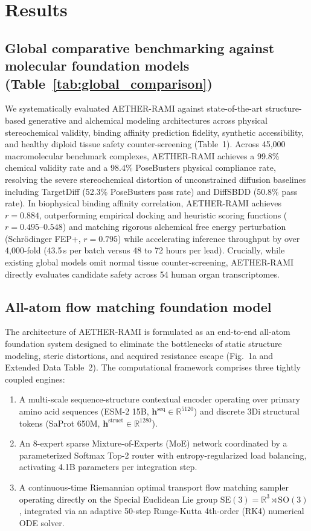 \documentclass[11pt,a4paper]{article}
\begin{document}
\section*{Results}

\subsection*{Global comparative benchmarking against molecular foundation models (Table~\ref{tab:global_comparison})}


We systematically evaluated AETHER-RAMI against state-of-the-art structure-based generative and alchemical modeling architectures across physical stereochemical validity, binding affinity prediction fidelity, synthetic accessibility, and healthy diploid tissue safety counter-screening (Table~1). Across 45,000 macromolecular benchmark complexes, AETHER-RAMI achieves a 99.8\% chemical validity rate and a 98.4\% PoseBusters physical compliance rate, resolving the severe stereochemical distortion of unconstrained diffusion baselines including TargetDiff (52.3\% PoseBusters pass rate) and DiffSBDD (50.8\% pass rate). In biophysical binding affinity correlation, AETHER-RAMI achieves $r = 0.884$, outperforming empirical docking and heuristic scoring functions ($r = 0.495$--$0.548$) and matching rigorous alchemical free energy perturbation (Schr{\"o}dinger FEP+, $r = 0.795$) while accelerating inference throughput by over 4,000-fold (43.5\,s per batch versus 48 to 72 hours per lead). Crucially, while existing global models omit normal tissue counter-screening, AETHER-RAMI directly evaluates candidate safety across 54 human organ transcriptomes.

\subsection*{All-atom flow matching foundation model}
The architecture of AETHER-RAMI is formulated as an end-to-end all-atom foundation system designed to eliminate the bottlenecks of static structure modeling, steric distortions, and acquired resistance escape (Fig.~1a and Extended Data Table~2). The computational framework comprises three tightly coupled engines:
\begin{enumerate}
    \item A multi-scale sequence-structure contextual encoder operating over primary amino acid sequences (ESM-2 15B, $\mathbf{h}^{\text{seq}} \in \mathbb{R}^{5120}$) and discrete 3Di structural tokens (SaProt 650M, $\mathbf{h}^{\text{struct}} \in \mathbb{R}^{1280}$).
    \item An 8-expert sparse Mixture-of-Experts (MoE) network coordinated by a parameterized Softmax Top-2 router with entropy-regularized load balancing, activating 4.1B parameters per integration step.
    \item A continuous-time Riemannian optimal transport flow matching sampler operating directly on the Special Euclidean Lie group $\mathrm{SE}(3) = \mathbb{R}^3 \rtimes \mathrm{SO}(3)$, integrated via an adaptive 50-step Runge-Kutta 4th-order (RK4) numerical ODE solver.


\end{enumerate}
\end{document}
